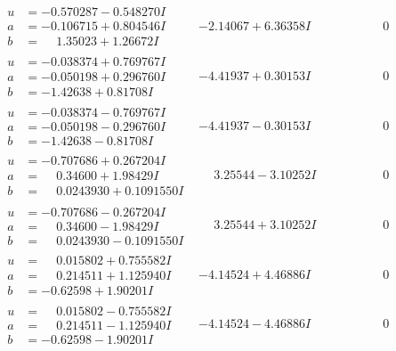 \documentclass[1p]{elsarticle_modified}
\theoremstyle{definition}
\begin{document}
$$\begin{array}{c|c|c}
\begin{aligned}
u &= -0.570287 - 0.548270 I \\
a &= -0.106715 + 0.804546 I \\
b &= \phantom{-}1.35023 + 1.26672 I\end{aligned}
 & -2.14067 + 6.36358 I & \phantom{-0.000000 } 0 \\ \hline\begin{aligned}
u &= -0.038374 + 0.769767 I \\
a &= -0.050198 + 0.296760 I \\
b &= -1.42638 + 0.81708 I\end{aligned}
 & -4.41937 + 0.30153 I & \phantom{-0.000000 } 0 \\ \hline\begin{aligned}
u &= -0.038374 - 0.769767 I \\
a &= -0.050198 - 0.296760 I \\
b &= -1.42638 - 0.81708 I\end{aligned}
 & -4.41937 - 0.30153 I & \phantom{-0.000000 } 0 \\ \hline\begin{aligned}
u &= -0.707686 + 0.267204 I \\
a &= \phantom{-}0.34600 + 1.98429 I \\
b &= \phantom{-}0.0243930 + 0.1091550 I\end{aligned}
 & \phantom{-}3.25544 - 3.10252 I & \phantom{-0.000000 } 0 \\ \hline\begin{aligned}
u &= -0.707686 - 0.267204 I \\
a &= \phantom{-}0.34600 - 1.98429 I \\
b &= \phantom{-}0.0243930 - 0.1091550 I\end{aligned}
 & \phantom{-}3.25544 + 3.10252 I & \phantom{-0.000000 } 0 \\ \hline\begin{aligned}
u &= \phantom{-}0.015802 + 0.755582 I \\
a &= \phantom{-}0.214511 + 1.125940 I \\
b &= -0.62598 + 1.90201 I\end{aligned}
 & -4.14524 + 4.46886 I & \phantom{-0.000000 } 0 \\ \hline\begin{aligned}
u &= \phantom{-}0.015802 - 0.755582 I \\
a &= \phantom{-}0.214511 - 1.125940 I \\
b &= -0.62598 - 1.90201 I\end{aligned}
 & -4.14524 - 4.46886 I & \phantom{-0.000000 } 0 \\ \hline\begin{aligned}

\end{aligned}
\end{array}$$
\end{document}
